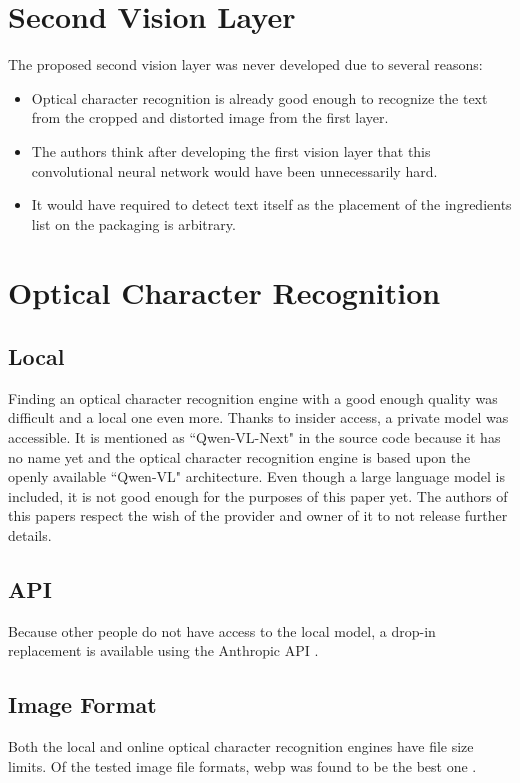 \documentclass[a4paper,11pt]{report}
\begin{document}
    \chapter{Second Vision Layer}
        The proposed second vision layer was never developed due to several reasons:
        \begin{itemize}
            \item Optical character recognition is already good enough to recognize the text from the cropped and distorted image from the first layer.
            \item The authors think after developing the first vision layer that this convolutional neural network would have been unnecessarily hard.
            \item It would have required to detect text itself as the placement of the ingredients list on the packaging is arbitrary.
        \end{itemize}
      
      
    \chapter{Optical Character Recognition}
     
        \section{Local}
            Finding an optical character recognition engine with a good enough quality was difficult and a local one even more. Thanks to insider access, a private model was accessible. It is mentioned as ``Qwen-VL-Next" in the source code because it has no name yet and the optical character recognition engine is based upon the openly available ``Qwen-VL" \cite{bai2023qwenvlversatilevisionlanguagemodel} architecture. Even though a large language model is included, it is not good enough for the purposes of this paper yet. The authors of this papers respect the wish of the provider and owner of it to not release further details.
            
        \section{API}
            Because other people do not have access to the local model, a drop-in replacement is available using the Anthropic API \cite{claude3-5sonnet}.
            
            
        \section{Image Format}
            Both the local and online optical character recognition engines have file size limits. Of the tested image file formats, webp was found to be the best one \cite{zern-webp-15} \cite{dornauer2023webimageformatsassessment}.
            
\end{document}
